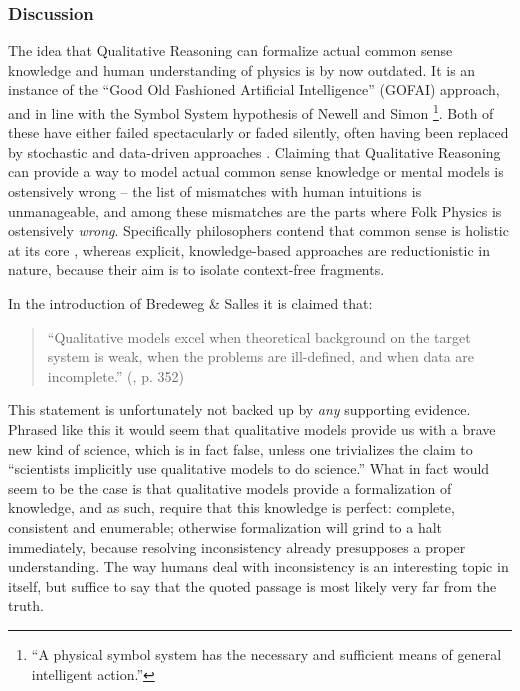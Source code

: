 \documentclass{article} %
\begin{document}
\subsubsection{Discussion}
\label{sec:litrev_qr_discussion}
The idea that Qualitative Reasoning can formalize actual common sense knowledge
and human understanding of physics is by now outdated. It is an instance of the
``Good Old Fashioned Artificial Intelligence'' (GOFAI) approach,
\cite{haugeland} and in line with the Symbol System hypothesis of Newell and
Simon \cite{newell}\footnote{``A physical symbol system has the necessary and
sufficient means of general intelligent action.''}.  Both of these have either
failed spectacularly or faded silently, often having been replaced by
stochastic and data-driven approaches \cite{russellnorvig}.  Claiming that
Qualitative Reasoning can provide a way to model actual common sense knowledge
or mental models is ostensively wrong -- the list of mismatches with human
intuitions is unmanageable, and among these mismatches are the parts where Folk
Physics is ostensively {\em wrong}. Specifically philosophers contend that
common sense is holistic at its core \cite{smith}, whereas explicit,
knowledge-based approaches are reductionistic in nature, because their aim is
to isolate context-free fragments. 

In the introduction of Bredeweg \& Salles \cite{bredeweg-eco} it is claimed
that:

	\begin{quote}
	``Qualitative models excel when theoretical background on the target
	system is weak, when the problems are ill-defined, and when data are
	incomplete.'' (\cite{bredeweg-eco}, p. 352)
	\end{quote}

This statement is unfortunately not backed up by {\em any} supporting evidence.
Phrased like this it would seem that qualitative models provide us with a brave
new kind of science, which is in fact false, unless one trivializes the claim
to ``scientists implicitly use qualitative models to do science.'' What in fact
would seem to be the case is that qualitative models provide a formalization
of knowledge, and as such, require that this knowledge is perfect: complete,
consistent and enumerable; otherwise formalization will grind to a halt
immediately, because resolving inconsistency already presupposes a proper
understanding. The way humans deal with inconsistency is an interesting topic
in itself, but suffice to say that the quoted passage is most likely very far
from the truth.
\end{document}
